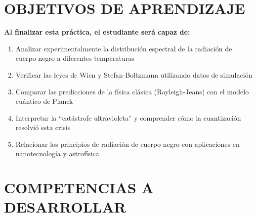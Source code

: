 \documentclass[12pt,a4paper]{article}
\begin{document}
	\section{OBJETIVOS DE APRENDIZAJE}
	
	\begin{objetivobox}
		\textbf{Al finalizar esta práctica, el estudiante será capaz de:}
		\begin{enumerate}
			\item Analizar experimentalmente la distribución espectral de la radiación de cuerpo negro a diferentes temperaturas
			\item Verificar las leyes de Wien y Stefan-Boltzmann utilizando datos de simulación
			\item Comparar las predicciones de la física clásica (Rayleigh-Jeans) con el modelo cuántico de Planck
			\item Interpretar la ``catástrofe ultravioleta'' y comprender cómo la cuantización resolvió esta crisis
			\item Relacionar los principios de radiación de cuerpo negro con aplicaciones en nanotecnología y astrofísica
		\end{enumerate}
	\end{objetivobox}
	
	
	\section{COMPETENCIAS A DESARROLLAR}
	
\end{document}
